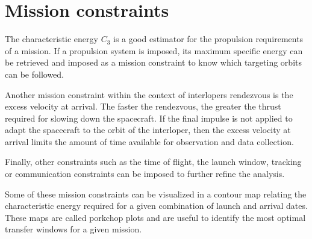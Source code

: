\section{Mission constraints}

The characteristic energy $C_3$ is a good estimator for the propulsion
requirements of a mission. If a propulsion system is imposed, its maximum
specific energy can be retrieved and imposed as a mission constraint to know
which targeting orbits can be followed.

Another mission constraint within the context of interlopers rendezvous is the
excess velocity at arrival. The faster the rendezvous, the greater the thrust
required for slowing down the spacecraft. If the final impulse is not applied to
adapt the spacecraft to the orbit of the interloper, then the excess velocity at
arrival limits the amount of time available for observation and data collection.

Finally, other constraints such as the time of flight, the launch window,
tracking or communication constraints can be imposed to further refine the
analysis.

Some of these mission constraints can be visualized in a contour map relating
the characteristic energy required for a given combination of launch and arrival
dates. These maps are called porkchop plots and are useful to identify the most
optimal transfer windows for a given mission.
